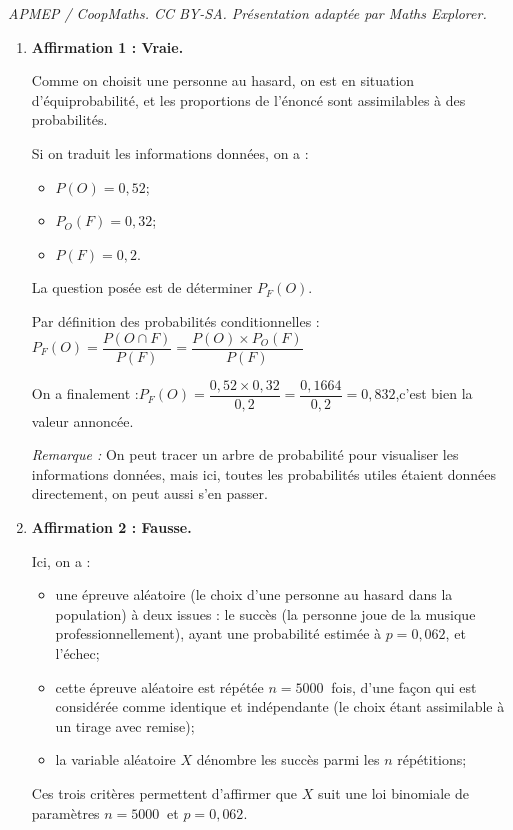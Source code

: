 \documentclass[10pt]{article}
\providecommand{\np}[2][]{{#2~#1}}
\begin{document}
\noindent\textit{APMEP / CoopMaths. CC BY-SA. Présentation adaptée par Maths Explorer.}\par\medskip
\begin{enumerate}
	\item \textbf{Affirmation 1 : Vraie.}

	Comme on choisit une personne au hasard, on est en situation d'équiprobabilité, et les proportions de l'énoncé sont assimilables à des probabilités.

	Si on traduit les informations données, on a :
	\begin{itemize}
		\item $P(O) = 0,52$;
		\item $P_O(F) = 0,32$;
		\item $P(F) = 0,2$.
	\end{itemize}

	La question posée est de déterminer $P_F(O)$.

	Par définition des probabilités conditionnelles :\quad $P_F(O) = \dfrac{P(O \cap F)}{P(F)} = \dfrac{P(O)\times P_O(F)}{P(F)}$

	On a finalement :\quad $P_F(O) = \dfrac{0,52 \times 0,32}{0,2} = \dfrac{0,1664}{0,2} = 0,832$,\quad c'est bien la valeur annoncée.

	\emph{Remarque :} On peut tracer un arbre de probabilité pour visualiser les informations données, mais ici, toutes les probabilités utiles étaient données directement, on peut aussi s'en passer.

	\item \textbf{Affirmation 2 : Fausse.}

	Ici, on a :
	\begin{itemize}
		\item une épreuve aléatoire (le choix d'une personne au hasard dans la population) à deux issues : le succès (la personne joue de la musique professionnellement), ayant une probabilité estimée à $p = 0,062$, et l'échec;
		\item cette épreuve aléatoire est répétée $n = \np{5000}$ fois, d'une façon qui est considérée comme identique et indépendante (le choix étant assimilable à un tirage avec remise);
		\item la variable aléatoire $X$ dénombre les succès parmi les $n$ répétitions;
	\end{itemize}

	Ces trois critères permettent d'affirmer que $X$ suit une loi binomiale de paramètres $n = \np{5000}$ et $p = 0,062$.


\end{enumerate}
\end{document}
